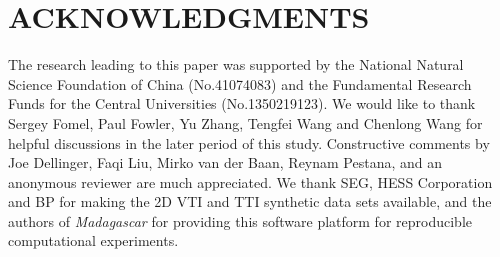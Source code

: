 \section{ACKNOWLEDGMENTS}
The research leading to this paper was supported by the National Natural Science Foundation of China (No.41074083)
and the Fundamental Research Funds for the Central Universities (No.1350219123).
We would like to thank Sergey Fomel, Paul Fowler, Yu Zhang, Tengfei Wang and Chenlong Wang
for helpful discussions in the later period of this study.
Constructive comments by Joe Dellinger, Faqi Liu, Mirko van der Baan, Reynam Pestana, and an anonymous reviewer
are much appreciated. We thank SEG, HESS Corporation and BP for making the 2D VTI and TTI synthetic data sets available,
and the authors of \emph{Madagascar} for providing this
software platform for reproducible computational experiments.
